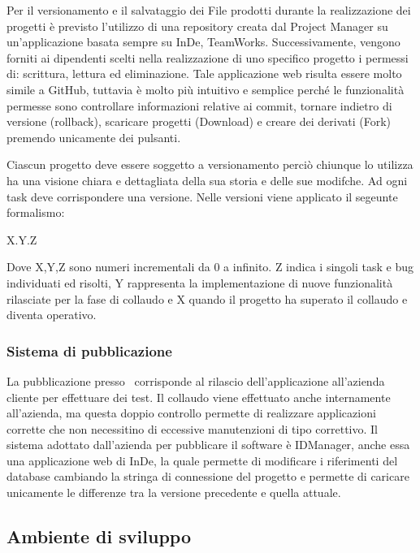 Per il versionamento e il salvataggio dei File prodotti durante la realizzazione dei progetti è previsto l'utilizzo di una repository creata dal Project Manager su un'applicazione basata sempre su InDe, TeamWorks. Successivamente, vengono forniti ai dipendenti scelti nella realizzazione di uno specifico progetto i permessi di: scrittura, lettura ed eliminazione.
Tale applicazione web risulta essere molto simile a GitHub, tuttavia è molto più intuitivo e semplice perché le funzionalità permesse sono controllare informazioni relative ai commit, tornare indietro di versione (rollback), scaricare progetti (Download) e creare dei derivati (Fork) premendo unicamente dei pulsanti.

Ciascun progetto deve essere soggetto a versionamento perciò chiunque lo utilizza ha una visione chiara e dettagliata della sua storia e delle sue modifche. Ad ogni task deve corrispondere una versione. Nelle versioni viene applicato il segeunte formalismo:
\begin{center}
	X.Y.Z
\end{center}
Dove X,Y,Z sono numeri incrementali da 0 a infinito. 
Z indica i singoli task e bug individuati ed risolti, Y rappresenta la implementazione di nuove funzionalità rilasciate per la fase di collaudo e X quando il progetto ha superato il collaudo e diventa operativo.  

\subsubsection{Sistema di pubblicazione}
La pubblicazione presso \azienda\ corrisponde al rilascio dell'applicazione all'azienda cliente per effettuare dei test. Il collaudo viene effettuato anche internamente all'azienda, ma questa doppio controllo permette di realizzare applicazioni corrette che non necessitino di eccessive manutenzioni di tipo correttivo. 
Il sistema adottato dall'azienda per pubblicare il software è IDManager, anche essa una applicazione web di InDe, la quale permette di modificare i riferimenti del database cambiando la stringa di connessione del progetto e permette di caricare unicamente le differenze tra la versione precedente e quella attuale.


\subsection{Ambiente di sviluppo}
\label{cap1:Ambiente di sviluppo}

